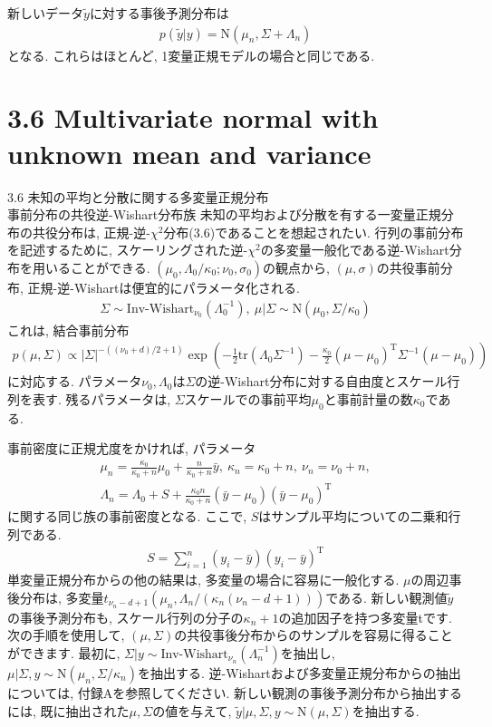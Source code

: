 \documentclass[10pt,dvipdfmx,a4]{beamer}
\newcommand{\eqn}[1]{\begin{align*}#1\end{align*}}
\begin{document}

\begin{frame}
新しいデータ$\tilde{y}$に対する事後予測分布は
\eqn{p(\tilde{y}|y)=\text{N}(\mu_n,\Sigma+\Lambda_n)}
となる.
これらはほとんど, 1変量正規モデルの場合と同じである.
\end{frame}

\section{3.6 Multivariate normal with unknown mean and variance}
\begin{frame}{3.6 未知の平均と分散に関する多変量正規分布\\事前分布の共役逆-Wishart分布族}
未知の平均および分散を有する一変量正規分布の共役分布は, 正規-逆-$\chi^2$分布(3.6)であることを想起されたい.
行列の事前分布を記述するために, スケーリングされた逆-$\chi^2$の多変量一般化である逆-Wishart分布を用いることができる.
$(\mu_0,\Lambda_0/\kappa_0;\nu_0, \sigma_0)$の観点から, $(\mu,\sigma)$の共役事前分布, 正規-逆-Wishartは便宜的にパラメータ化される.
\eqn{\Sigma\sim\text{Inv-Wishart}_{\nu_0}(\Lambda_0^{-1}),\ \mu|\Sigma\sim\text{N}(\mu_0,\Sigma/\kappa_0)}
これは, 結合事前分布
\eqn{p(\mu,\Sigma)\propto|\Sigma|^{-((\nu_0+d)/2+1)}\exp \left(-\frac{1}{2}\text{tr}(\Lambda_0\Sigma^{-1})-\frac{\kappa_0}{2}(\mu-\mu_0)^{\mathrm{T}}\Sigma^{-1}(\mu-\mu_0)\right)}
に対応する.
パラメータ$\nu_0, \Lambda_0$は$\Sigma$の逆-Wishart分布に対する自由度とスケール行列を表す.
残るパラメータは, $\Sigma$スケールでの事前平均$\mu_0$と事前計量の数$\kappa_0$である.
\end{frame}


\begin{frame}
事前密度に正規尤度をかければ, パラメータ
\eqn{\mu_n=\frac{\kappa_0}{\kappa_0+n}\mu_0+\frac{n}{\kappa_0+n}\bar{y},\ \kappa_n=\kappa_0+n,\ \nu_n=\nu_0+n,\\\Lambda_n=\Lambda_0+S+\frac{\kappa_0n}{\kappa_0+n}(\bar{y}-\mu_0)(\bar{y}-\mu_0)^{\mathrm{T}}}
に関する同じ族の事前密度となる.
ここで, $S$はサンプル平均についての二乗和行列である.
\eqn{S=\sum_{i=1}^n(y_i-\bar{y})(y_i-\bar{y})^{\mathrm{T}}}
単変量正規分布からの他の結果は, 多変量の場合に容易に一般化する.
$\mu$の周辺事後分布は, 多変量$t_{\nu_n-d+1}(\mu_n,\Lambda_n/(\kappa_n(\nu_n-d+1)))$である.
新しい観測値$\tilde{y}$の事後予測分布も, スケール行列の分子の$\kappa_n+1$の追加因子を持つ多変量tです.
次の手順を使用して, $(\mu,\Sigma)$の共役事後分布からのサンプルを容易に得ることができます.
最初に, $\Sigma|y\sim \text{Inv-Wishart}_{\nu_n}(\Lambda^{- 1}_n)$を抽出し, $\mu|\Sigma,y\sim \text{N}(\mu_n, \Sigma/\kappa_n)$を抽出する.
逆-Wishartおよび多変量正規分布からの抽出については, 付録Aを参照してください.
新しい観測の事後予測分布から抽出するには, 既に抽出された$\mu, \Sigma$の値を与えて, $\tilde{y}|\mu,\Sigma,y\sim\text{N}(\mu,\Sigma)$を抽出する.
\end{frame}
\end{document}
